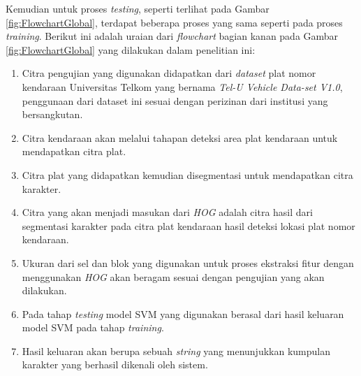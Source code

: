 %
\noindent Kemudian untuk proses \textit{testing}, seperti terlihat pada Gambar \ref{fig:FlowchartGlobal}, terdapat beberapa proses yang sama seperti pada proses \textit{training}. Berikut ini adalah uraian dari \textit{flowchart} bagian kanan pada Gambar \ref{fig:FlowchartGlobal} yang dilakukan dalam penelitian ini:
\begin{enumerate}
	\item Citra pengujian yang digunakan didapatkan dari \textit{dataset} plat nomor kendaraan Universitas Telkom yang bernama \textit{Tel-U Vehicle Data-set V1.0}, penggunaan dari dataset ini sesuai dengan perizinan dari institusi yang bersangkutan. 
	\item Citra kendaraan akan melalui tahapan deteksi area plat kendaraan untuk mendapatkan citra plat.
	\item Citra plat yang didapatkan kemudian disegmentasi untuk mendapatkan citra karakter. 
	\item Citra yang akan menjadi masukan dari \textit{HOG} adalah citra hasil dari segmentasi karakter pada citra plat kendaraan hasil deteksi lokasi plat nomor kendaraan.
	\item Ukuran dari sel dan blok yang digunakan untuk proses ekstraksi fitur dengan menggunakan \textit{HOG} akan beragam sesuai dengan pengujian yang akan dilakukan.
	\item Pada tahap \textit{testing} model SVM yang digunakan berasal dari hasil keluaran model SVM pada tahap \textit{training}.
	\item Hasil keluaran akan berupa sebuah \textit{string} yang menunjukkan kumpulan karakter yang berhasil dikenali oleh sistem.\\
\end{enumerate}


